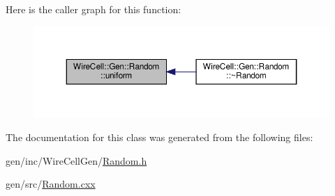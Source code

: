 Here is the caller graph for this function\+:
\nopagebreak
\begin{figure}[H]
\begin{center}
\leavevmode
\includegraphics[width=350pt]{class_wire_cell_1_1_gen_1_1_random_aa470ac91289961da741d0d31ccfb83d8_icgraph}
\end{center}
\end{figure}


The documentation for this class was generated from the following files\+:\begin{DoxyCompactItemize}
\item 
gen/inc/\+Wire\+Cell\+Gen/\hyperlink{_random_8h}{Random.\+h}\item 
gen/src/\hyperlink{_random_8cxx}{Random.\+cxx}\end{DoxyCompactItemize}
